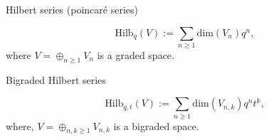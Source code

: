 \documentclass[12pt]{amsart}
\begin{document}
\vspace{-10pt}
\begin{mdframed}[linecolor=cyan!20,linewidth=3pt,innertopmargin=8pt]
	\begin{minipage}[t]{9cm}
		\begin{bf}Hilbert series (poincaré series)\end{bf}
		\begin{equation}\textrm{Hilb}_q(V):=\sum_{n\geq 1}\textrm{dim}(V_n)q^n,
		\end{equation}
		where $V=\oplus_{n\geq 1}V_{n}$ is a graded space.
	\end{minipage}
	\begin{minipage}[t]{9cm}
		\begin{bf}Bigraded Hilbert series \end{bf}
		\begin{equation}\textrm{Hilb}_{q,t}(V):=\sum_{n\geq 1}\textrm{dim}(V_{n,k})q^nt^k,
		\end{equation}
		where, $V=\oplus_{n,k\geq 1}V_{n,k}$ is a bigraded space.
	\end{minipage}
\end{mdframed}

\vspace{-10pt}
\end{document}
